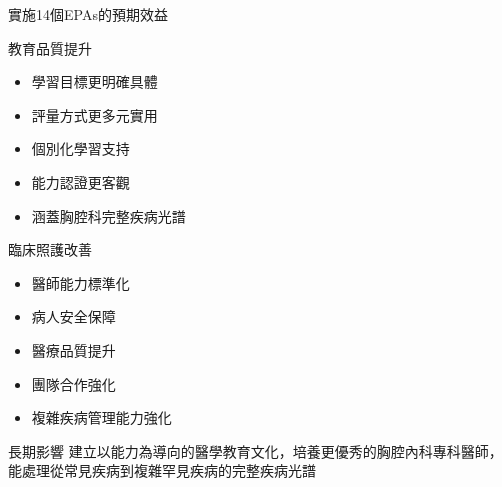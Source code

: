\documentclass[aspectratio=169]{beamer}
\begin{document}
\begin{frame}{實施14個EPAs的預期效益}
\begin{block}{教育品質提升}
\begin{itemize}
\item 學習目標更明確具體
\item 評量方式更多元實用
\item 個別化學習支持
\item 能力認證更客觀
\item \textcolor{emergency_red}{涵蓋胸腔科完整疾病光譜}
\end{itemize}
\end{block}

\begin{block}{臨床照護改善}
\begin{itemize}
\item 醫師能力標準化
\item 病人安全保障
\item 醫療品質提升
\item 團隊合作強化
\item \textcolor{emergency_red}{複雜疾病管理能力強化}
\end{itemize}
\end{block}

\begin{alertblock}{長期影響}
建立以能力為導向的醫學教育文化，培養更優秀的胸腔內科專科醫師，能處理從常見疾病到複雜罕見疾病的完整疾病光譜
\end{alertblock}
\end{frame}
\end{document}

